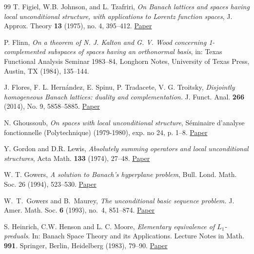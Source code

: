 \documentclass[11pt]{amsart}
\theoremstyle{definition}
\numberwithin{equation}{section}
\begin{document}
\begin{thebibliography}{99}
T. Figiel, W.B. Johnson, and L. Tzafriri,
\textit{On Banach lattices and spaces having local unconditional structure, with applications to Lorentz function spaces},
J. Approx. Theory \textbf{13} (1975), no. 4, 395--412.
\href{https://www.sciencedirect.com/science/article/pii/0021904575900234}{Paper}

P. Flinn, \textit{On a theorem of N. J. Kalton and G. V. Wood concerning 1-complemented subspaces of spaces having an orthonormal basis}, in: Texas Functional Analysis Seminar 1983--84, Longhorn Notes, University of Texas Press, Austin, TX (1984), 135--144.

J. Flores, F. L. Hern\'andez, E. Spinu, P. Tradacete, V. G. Troitsky, 
\textit{Disjointly homogeneous Banach lattices: duality and complementation.}
J. Funct. Anal. \textbf{266} (2014), No. 9, 5858--5885. \href{https://doi.org/10.1016/j.jfa.2013.12.024}{Paper} 

N. Ghoussoub, \emph{On spaces with local unconditional structure},
Séminaire d’analyse fonctionnelle (Polytechnique) (1979-1980), exp. no 24, p. 1--8. \href{https://www.numdam.org/item/?id=SAF_1979-1980____A21_0}{Paper}


Y. Gordon and D.R. Lewis, \emph{Absolutely summing operators and local unconditional structures}, Acta Math. \textbf{133} (1974), 27--48. \href{https://projecteuclid.org/journals/acta-mathematica/volume-133/issue-none/Absolutely-summing-operators-and-local-unconditional-structures/10.1007/BF02392140.full}{Paper}

W. T. Gowers, \textit{A solution to Banach's hyperplane problem}, Bull. Lond. Math. Soc. 26 (1994), 523--530. \href{https://doi.org/10.1112/blms/26.6.523}{Paper}


 W.~T.~Gowers and B.~Maurey, \textit{The unconditional basic sequence problem.} J. Amer. Math. Soc. \textbf{6} (1993), no.~4, 851--874. \href{https://doi.org/10.2307/2152743}{Paper}



S. Heinrich, C.W. Henson and L. C. Moore, \textit{Elementary equivalence of $L_1$-preduals}. In: Banach Space
Theory and its Applications. Lecture Notes in Math. \textbf{991}. Springer, Berlin, Heidelberg (1983), 79--90. \href{https://link.springer.com/chapter/10.1007/BFb0061559}{Paper}





\end{thebibliography}
\end{document}
